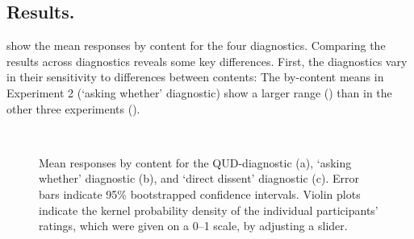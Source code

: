 \documentclass[12pt]{article}
\begin{document}
  \subsection{Results.}
     show the mean responses by content for the four diagnostics. Comparing the results across diagnostics reveals some key differences.
    First, the diagnostics vary in their sensitivity to differences between contents: The by-content means in Experiment 2 (`asking whether' diagnostic) show a larger range () than in the other three experiments ().

    \begin{figure}[ht]

      \caption{Mean responses by content for the QUD-diagnostic (a), `asking whether' diagnostic (b), and `direct dissent' diagnostic (c). Error bars indicate 95\% bootstrapped confidence intervals. Violin plots indicate the kernel probability density of the individual participants’ ratings, which were given on a 0--1 scale, by adjusting a slider.} \label{fig:slider-ratings}

      \centering
        \\
        \vspace{-\baselineskip}
    \end{figure}
\end{document}
